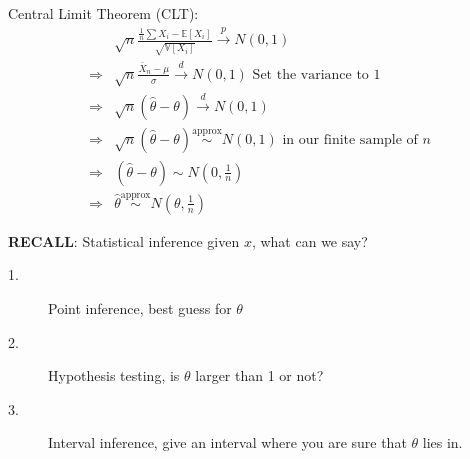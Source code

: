 Central Limit Theorem (CLT):
\begin{align*}
  & \sqrt{n} \frac{\frac{1}{n} \sum X_i - \mathbb{E}[X_i]}{\sqrt{\mathbb{V}[X_i]}} \overset{p}{\rightarrow} N(0, 1) \\
  \Rightarrow & \sqrt{n} \frac{\bar{X}_n - \mu}{\sigma} \overset{d}{\rightarrow} N(0, 1) \text{ Set the variance to 1} \\
  \Rightarrow & \sqrt{n} (\hat{\theta} - \theta) \overset{d}{\rightarrow} N(0, 1) \\
  \Rightarrow & \sqrt{n} (\hat{\theta} - \theta) \overset{\text{approx}}{\sim} N(0, 1) \text{ in our finite sample of } n \\
  \Rightarrow & (\hat{\theta} - \theta) \sim N\left(0, \frac{1}{n}\right) \\
  \Rightarrow & \hat{\theta} \overset{\text{approx}}{\sim} N\left(\theta, \frac{1}{n}\right) 
\end{align*}

\textbf{RECALL}: Statistical inference given $x$, what can we say?
\begin{description}
  \item[1.] Point inference, best guess for $\theta$
  \item[2.] Hypothesis testing, is $\theta$ larger than 1 or not?
  \item[3.] Interval inference, give an interval where you are sure that $\theta$ lies in.
\end{description}